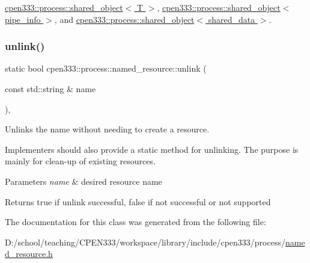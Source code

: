 \hyperlink{classcpen333_1_1process_1_1shared__object_aa5b43829da5bd2376927e6285745211c}{cpen333\+::process\+::shared\+\_\+object$<$ T $>$}, \hyperlink{classcpen333_1_1process_1_1shared__object_aa5b43829da5bd2376927e6285745211c}{cpen333\+::process\+::shared\+\_\+object$<$ pipe\+\_\+info $>$}, and \hyperlink{classcpen333_1_1process_1_1shared__object_aa5b43829da5bd2376927e6285745211c}{cpen333\+::process\+::shared\+\_\+object$<$ shared\+\_\+data $>$}.

\mbox{\label{classcpen333_1_1process_1_1named__resource_a6cb427f033b51f08fcf2bc1e08bd6a32}} 
\subsubsection{\texorpdfstring{unlink()}{unlink()}\hspace{0.1cm}{\footnotesize\ttfamily [2/2]}}
{\footnotesize\ttfamily static bool cpen333\+::process\+::named\+\_\+resource\+::unlink (\begin{DoxyParamCaption}\item[{const std\+::string \&}]{name }\end{DoxyParamCaption})\hspace{0.3cm}{\ttfamily [inline]}, {\ttfamily [static]}}



Unlinks the name without needing to create a resource. 

Implementers should also provide a static method for unlinking. The purpose is mainly for clean-\/up of existing resources.


\begin{DoxyParams}{Parameters}
{\em name} & desired resource name \\
\hline
\end{DoxyParams}
\begin{DoxyReturn}{Returns}
{\ttfamily true} if unlink successful, {\ttfamily false} if not successful or not supported 
\end{DoxyReturn}


The documentation for this class was generated from the following file\+:\begin{DoxyCompactItemize}
\item 
D\+:/school/teaching/\+C\+P\+E\+N333/workspace/library/include/cpen333/process/\hyperlink{named__resource_8h}{named\+\_\+resource.\+h}\end{DoxyCompactItemize}
